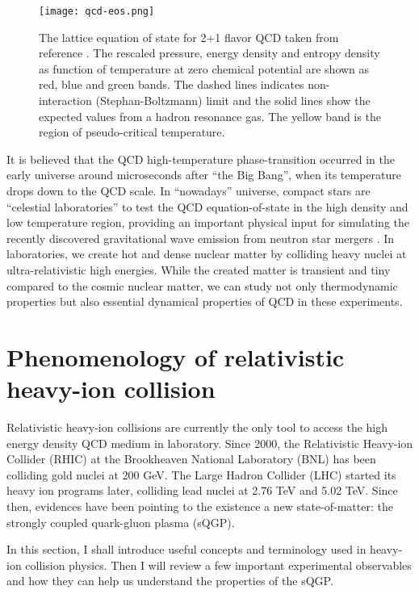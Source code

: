 \begin{figure}
    \centering
    \texttt{[image: qcd-eos.png]}
    \caption{The lattice equation of state for 2+1 flavor QCD taken from reference \cite{Bazavov:2014pvz}. The rescaled pressure, energy density and entropy density as function of temperature at zero chemical potential are shown as red, blue and green bands. The dashed lines indicates non-interaction (Stephan-Boltzmann) limit and the solid lines show the expected values from a hadron resonance gas. The yellow band is the region of pseudo-critical temperature.}
    \label{fig:qcd_eos}
\end{figure}

It is believed that the QCD high-temperature phase-transition occurred in the early universe around microseconds after ``the Big Bang'', when its temperature drops down to the QCD scale.
In ``nowadays'' universe, compact stars are ``celestial laboratories'' to test the QCD equation-of-state in the high density and low temperature region, providing an important physical input for simulating the recently discovered gravitational wave emission from neutron star mergers \cite{TheLIGOScientific:2017qsa}.
In laboratories, we create hot and dense nuclear matter by colliding heavy nuclei at ultra-relativistic high energies.
While the created matter is transient and tiny compared to the cosmic nuclear matter, we can study not only thermodynamic properties but also essential dynamical properties of QCD in these experiments.

\section{Phenomenology of relativistic heavy-ion collision}
Relativistic heavy-ion collisions are currently the only tool to access the high energy density QCD medium in laboratory.
Since 2000, the Relativistic Heavy-ion Collider (RHIC) at the Brookheaven National Laboratory (BNL) has been colliding gold nuclei at 200 GeV. 
The Large Hadron Collider (LHC) started its heavy ion programs later, colliding lead nuclei at 2.76 TeV and 5.02 TeV.
Since then, evidences have been pointing to the existence a new state-of-matter: the strongly coupled quark-gluon plasma (sQGP).

In this section, I shall introduce useful concepts and terminology used in heavy-ion collision physics.
Then I will review a few important experimental observables and how they can help us understand the properties of the sQGP.

